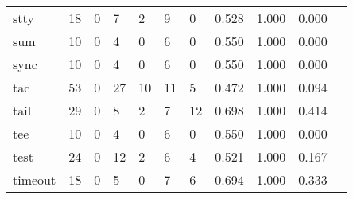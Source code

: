 \begin{longtable}{lp{1.10cm}p{1.10cm}p{1.10cm}p{1.10cm}p{1.10cm}p{1.10cm}p{1.10cm}p{1.10cm}p{1.10cm}p{1.10cm}}
stty      &                     18 &                                  0 &                                 7 &                                2 &                                 9 &                               0 &                          0.528 &                                 1.000 &                               0.000 \\
sum       &                     10 &                                  0 &                                 4 &                                0 &                                 6 &                               0 &                          0.550 &                                 1.000 &                               0.000 \\
sync      &                     10 &                                  0 &                                 4 &                                0 &                                 6 &                               0 &                          0.550 &                                 1.000 &                               0.000 \\
tac       &                     53 &                                  0 &                                27 &                               10 &                                11 &                               5 &                          0.472 &                                 1.000 &                               0.094 \\
tail      &                     29 &                                  0 &                                 8 &                                2 &                                 7 &                              12 &                          0.698 &                                 1.000 &                               0.414 \\
tee       &                     10 &                                  0 &                                 4 &                                0 &                                 6 &                               0 &                          0.550 &                                 1.000 &                               0.000 \\
test      &                     24 &                                  0 &                                12 &                                2 &                                 6 &                               4 &                          0.521 &                                 1.000 &                               0.167 \\
timeout   &                     18 &                                  0 &                                 5 &                                0 &                                 7 &                               6 &                          0.694 &                                 1.000 &                               0.333 \\

\end{longtable}

